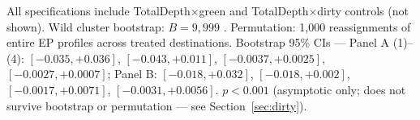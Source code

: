 \begin{threeparttable}
\begin{tabular}{lcccc}
\bottomrule
\end{tabular}
\begin{tablenotes}\footnotesize
\item All specifications include TotalDepth$\times$green and TotalDepth$\times$dirty controls (not shown). Wild cluster bootstrap: $B = 9{,}999$ \citep{cameron2008,roodman2019}. Permutation: 1{,}000 reassignments of entire EP profiles across treated destinations. Bootstrap 95\% CIs --- Panel A (1)--(4): $[-0.035,+0.036]$, $[-0.043,+0.011]$, $[-0.0037,+0.0025]$, $[-0.0027,+0.0007]$; Panel B: $[-0.018,+0.032]$, $[-0.018,+0.002]$, $[-0.0017,+0.0071]$, $[-0.0031,+0.0056]$. \sym{***} $p<0.001$ (asymptotic only; does not survive bootstrap or permutation --- see Section~\ref{sec:dirty}).
\end{tablenotes}
\end{threeparttable}

